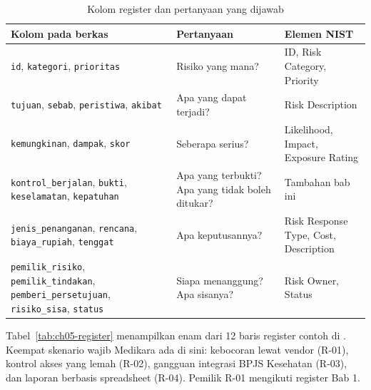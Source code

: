 \begin{table}[!htb]
  \centering\small
  \caption{Kolom register dan pertanyaan yang dijawab}\label{tab:ch05-kolom}
  \begin{tabularx}{\textwidth}{|>{\raggedright\arraybackslash}X|>{\raggedright\arraybackslash}p{}|>{\raggedright\arraybackslash}p{}|}
    \hline
    \textbf{Kolom pada berkas} & \textbf{Pertanyaan} & \textbf{Elemen NIST} \\ \hline
    \texttt{id}, \texttt{kategori}, \texttt{prioritas} & Risiko yang mana? & ID, Risk Category,
    Priority \\ \hline
    \texttt{tujuan}, \texttt{sebab}, \texttt{peristiwa}, \texttt{akibat} & Apa yang dapat terjadi? &
    Risk Description \\ \hline
    \texttt{kemungkinan}, \texttt{dampak}, \texttt{skor} & Seberapa serius? & Likelihood, Impact,
    Exposure Rating \\ \hline
    \texttt{kontrol\_berjalan}, \texttt{bukti}, \texttt{keselamatan}, \texttt{kepatuhan} & Apa yang
    terbukti? Apa yang tidak boleh ditukar? & Tambahan bab ini \\ \hline
    \texttt{jenis\_penanganan}, \texttt{rencana}, \texttt{biaya\_rupiah}, \texttt{tenggat} & Apa
    keputusannya? & Risk Response Type, Cost, Description \\ \hline
    \texttt{pemilik\_risiko}, \texttt{pemilik\_tindakan}, \texttt{pemberi\_persetujuan},
    \texttt{risiko\_sisa}, \texttt{status} & Siapa menanggung? Apa sisanya? & Risk Owner, Status \\
    \hline
  \end{tabularx}
\end{table}

Tabel~\ref{tab:ch05-register} menampilkan enam dari 12 baris register contoh di
. Keempat skenario wajib Medikara ada di
sini: kebocoran lewat vendor (R-01), kontrol akses yang lemah (R-02), gangguan integrasi BPJS
Kesehatan (R-03), dan laporan berbasis spreadsheet (R-04). Pemilik R-01 mengikuti register Bab 1.

